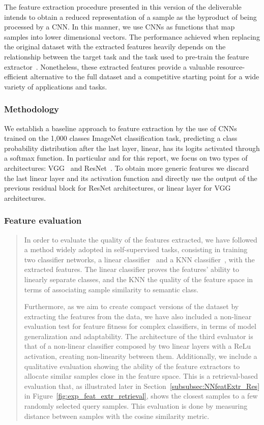 The feature extraction procedure presented in this version of the deliverable intends to obtain a reduced representation of a sample as the byproduct of being processed by a CNN. In this manner, we use CNNs as functions that map samples into lower dimensional vectors. The performance achieved when replacing the original dataset with the extracted features heavily depends on the relationship between the target task and the task used to pre-train the feature extractor~\cite{2018_CVPR_taskonomy}. Nonetheless, these extracted features provide a valuable resource-efficient alternative to the full dataset and a competitive starting point for a wide variety of applications and tasks.   


\subsubsection{Methodology}\label{subsubsec:NNfeatExtr_Meth}
We establish a baseline approach to feature extraction by the use of CNNs trained on the 1,000 classes ImageNet classification task, predicting a class probability distribution after the last layer, linear, has its logits activated through a softmax function. In particular and for this report, we focus on two types of architectures: VGG~\cite{2016_ICLR_VGG} and ResNet~\cite{2016_CVPR_ResNet}. To obtain more generic features we discard the last linear layer and its activation function and directly use the output of the previous residual block for ResNet architectures, or linear layer for VGG architectures. 

\subsubsection*{Feature evaluation}
\begin{quote}
In order to evaluate the quality of the features extracted, we have followed a method widely adopted in self-supervised tasks, consisting in training two classifier networks, a linear classifier~\cite{2020_ICML_simple} and a KNN classifier~\cite{2018_CVPR_unsupervised}, with the extracted features. The linear classifier proves the features' ability to linearly separate classes, and the KNN the quality of the feature space in terms of associating sample similarity to semantic class.

Furthermore, as we aim to create compact versions of the dataset by extracting the features from the data, we have also included a non-linear evaluation test for feature fitness for complex classifiers, in terms of model generalization and adaptability. The architecture of the third evaluator is that of  a non-linear classifier composed by two linear layers with a ReLu activation, creating non-linearity between them. Additionally, we include a qualitative evaluation showing the ability of the feature extractors to allocate similar samples close in the feature space. This is a retrieval-based evaluation that, as illustrated later in Section~\ref{subsubsec:NNfeatExtr_Res} in Figure~\ref{fig:exp_feat_extr_retrieval}, shows the closest samples to a few randomly selected query samples. This evaluation is done by measuring distance between samples with the cosine similarity metric.
\end{quote}

